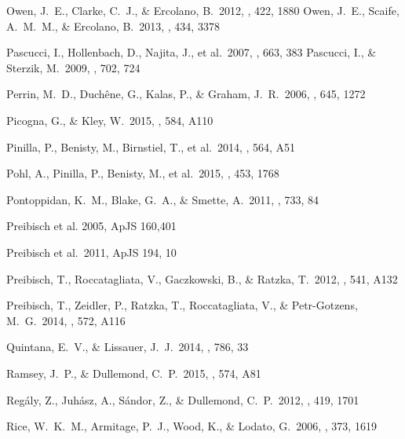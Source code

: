 \begin{thebibliography}{2000b}
 Owen, J.~E., Clarke, 
C.~J., \& Ercolano, B.\ 2012, \mnras, 422, 1880 
 Owen, J.~E., Scaife, 
A.~M.~M., \& Ercolano, B.\ 2013, \mnras, 434, 3378 

 Pascucci, I., 
Hollenbach, D., Najita, J., et al.\ 2007, \apj, 663, 383 
 Pascucci, I., \& Sterzik, M.\ 2009, \apj, 702, 724 

 Perrin, M.~D., 
Duch{\^e}ne, G., Kalas, P., \& Graham, J.~R.\ 2006, \apj, 645, 1272 

 Picogna, G., \& Kley, W.\ 2015, \aap, 584, A110

 Pinilla, P., Benisty, M., Birnstiel, T., et al.\ 2014, \aap, 564, A51 

 Pohl, A., Pinilla, P., 
Benisty, M., et al.\ 2015, \mnras, 453, 1768 


 Pontoppidan, K.~M., Blake, G.~A., \& Smette, A.\ 2011, \apj, 733, 84

 Preibisch et al. 2005, ApJS 160,401

 Preibisch et al.~2011, ApJS 194, 10

 Preibisch, T., Roccatagliata, V., Gaczkowski, B., \& Ratzka, T.\ 2012, \aap, 541, A132 

 Preibisch, T., Zeidler, P., Ratzka, T., Roccatagliata, V., \& Petr-Gotzens, M.~G.\ 2014, \aap, 572, A116

 Quintana, E.~V., \& Lissauer, J.~J.\ 2014, \apj, 786, 33 

 Ramsey, J.~P., \& Dullemond, C.~P.\ 2015, \aap, 574, A81 

 Reg{\'a}ly, Z., 
Juh{\'a}sz, A., S{\'a}ndor, Z., 
\& Dullemond, C.~P.\ 2012, \mnras, 419, 1701 


 Rice, W.~K.~M., Armitage, 
P.~J., Wood, K., \& Lodato, G.\ 2006, \mnras, 373, 1619 


\end{thebibliography}
